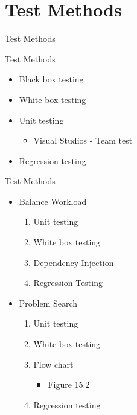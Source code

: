 \section{Test Methods}
\begin{frame}{Test Methods}
\end{frame}
\begin{frame}{Test Methods}
	\begin{itemize}
		\item Black box testing
		\item White box testing
		\item Unit testing
		\begin{itemize}
				\item Visual Studios - Team test
		\end{itemize}
		\item Regression testing
	\end{itemize}
\end{frame}

\begin{frame}{Test Methods}
	\begin{itemize}
		\item Balance Workload
			\begin{enumerate}
				\item Unit testing
				\item White box testing
				\item Dependency Injection
				\item Regression Testing
			\end{enumerate}
		\item Problem Search
		\begin{enumerate}
				\item Unit testing
				\item White box testing
			\item Flow chart
			\begin{itemize}
			\item Figure 15.2
			\end{itemize}
			\item Regression testing
		\end{enumerate}
	\end{itemize}
\end{frame}